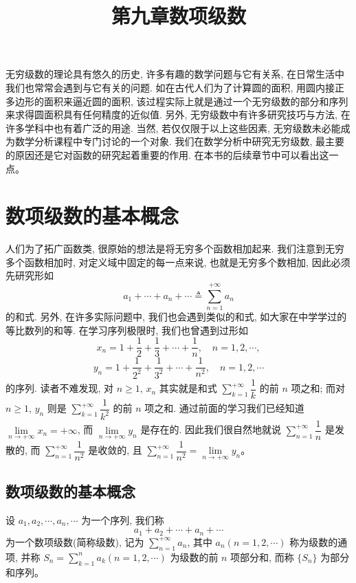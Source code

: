 \documentclass[UTF8,12pt,a4paper,fontset=fandol]{ctexart}
\title{第九章\quad 数项级数}
\author{}
\date{}
\begin{document}
\maketitle

无穷级数的理论具有悠久的历史, 许多有趣的数学问题与它有关系, 在日常生活中我们也常常会遇到与它有关的问题. 如在古代人们为了计算圆的面积, 用圆内接正多边形的面积来逼近圆的面积, 该过程实际上就是通过一个无穷级数的部分和序列来求得圆面积具有任何精度的近似值. 另外, 无穷级数中有许多研究技巧与方法, 在许多学科中也有着广泛的用途. 当然, 若仅仅限于以上这些因素, 无穷级数未必能成为数学分析课程中专门讨论的一个对象. 我们在数学分析中研究无穷级数, 最主要的原因还是它对函数的研究起着重要的作用. 在本书的后续章节中可以看出这一点。

\section{数项级数的基本概念}

人们为了拓广函数类, 很原始的想法是将无穷多个函数相加起来. 我们注意到无穷多个函数相加时, 对定义域中固定的每一点来说, 也就是无穷多个数相加, 因此必须先研究形如
\begin{equation}
  a_1+\cdots+a_n+\cdots\triangleq \sum_{n=1}^{+\infty}a_n
  \tag{9.1.1}
\end{equation}
的和式. 另外, 在许多实际问题中, 我们也会遇到类似的和式, 如大家在中学学过的等比数列的和等. 在学习序列极限时, 我们也曾遇到过形如
\[
  x_n=1+\frac12+\frac13+\cdots+\frac1n,\quad n=1,2,\cdots,
\]
\[
  y_n=1+\frac1{2^2}+\frac1{3^2}+\cdots+\frac1{n^2},\quad n=1,2,\cdots
\]
的序列. 读者不难发现, 对 $n\geq1$, $x_n$ 其实就是和式 $\sum\limits_{k=1}^{+\infty}\dfrac1k$ 的前 $n$ 项之和; 而对 $n\geq1$, $y_n$ 则是 $\sum\limits_{k=1}^{+\infty}\dfrac1{k^2}$ 的前 $n$ 项之和. 通过前面的学习我们已经知道 $\lim\limits_{n\to+\infty}x_n=+\infty$, 而 $\lim\limits_{n\to+\infty}y_n$ 是存在的. 因此我们很自然地就说 $\sum\limits_{n=1}^{+\infty}\dfrac1n$ 是发散的, 而 $\sum\limits_{n=1}^{+\infty}\dfrac1{n^2}$ 是收敛的, 且 $\sum\limits_{n=1}^{+\infty}\dfrac1{n^2}=\lim\limits_{n\to+\infty}y_n$。

\subsection{数项级数的基本概念}

设 $a_1,a_2,\cdots,a_n,\cdots$ 为一个序列, 我们称
\[
  a_1+a_2+\cdots+a_n+\cdots
\]
为一个数项级数(简称级数), 记为 $\sum\limits_{n=1}^{+\infty}a_n$, 其中 $a_n(n=1,2,\cdots)$ 称为级数的通项, 并称 $S_n=\sum\limits_{k=1}^n a_k(n=1,2,\cdots)$ 为级数的前 $n$ 项部分和, 而称 $\{S_n\}$ 为部分和序列。
\end{document}
